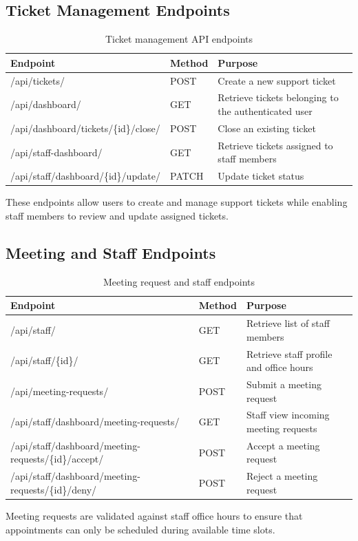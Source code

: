 \subsection{Ticket Management Endpoints}
\begin{table}[h]
\centering
\begin{tabular}{|l|l|p{7cm}|}
\hline
\textbf{Endpoint} & \textbf{Method} & \textbf{Purpose} \\
\hline
/api/tickets/ & POST & Create a new support ticket \\
/api/dashboard/ & GET & Retrieve tickets belonging to the authenticated user \\
/api/dashboard/tickets/\{id\}/close/ & POST & Close an existing ticket \\
/api/staff-dashboard/ & GET & Retrieve tickets assigned to staff members \\
/api/staff/dashboard/\{id\}/update/ & PATCH & Update ticket status \\
\hline
\end{tabular}
\caption{Ticket management API endpoints}
\end{table}
These endpoints allow users to create and manage support tickets while enabling staff members to review and update assigned tickets.

\subsection{Meeting and Staff Endpoints}
\begin{table}[h]
\centering
\begin{tabular}{|p{6cm}|l|p{7cm}|}
\hline
\textbf{Endpoint} & \textbf{Method} & \textbf{Purpose} \\
\hline
/api/staff/ & GET & Retrieve list of staff members \\
/api/staff/\{id\}/ & GET & Retrieve staff profile and office hours \\
/api/meeting-requests/ & POST & Submit a meeting request \\
/api/staff/dashboard/meeting-requests/ & GET & Staff view incoming meeting requests \\
/api/staff/dashboard/meeting-requests/\{id\}/accept/ & POST & Accept a meeting request \\
/api/staff/dashboard/meeting-requests/\{id\}/deny/ & POST & Reject a meeting request \\
\hline
\end{tabular}
\caption{Meeting request and staff endpoints}
\end{table}
Meeting requests are validated against staff office hours to ensure that appointments can only be scheduled during available time slots.

